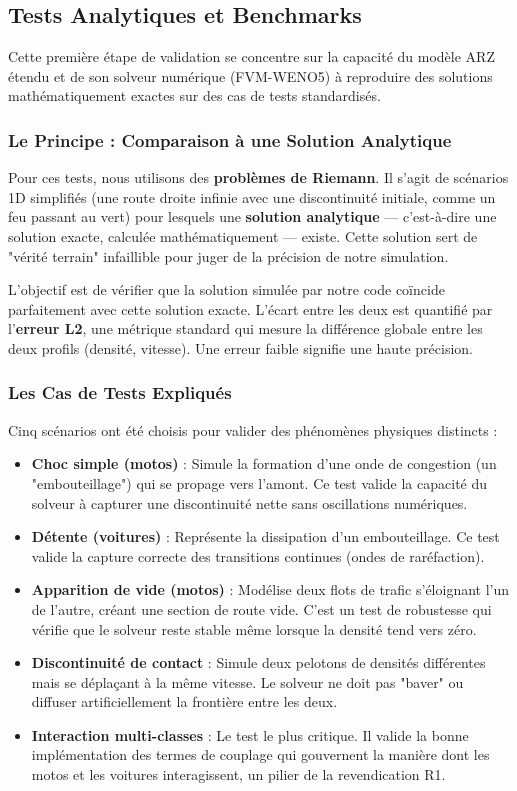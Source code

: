 \subsection{Tests Analytiques et Benchmarks}
\label{subsec:tests_analytiques}

Cette première étape de validation se concentre sur la capacité du modèle ARZ étendu et de son solveur numérique (FVM-WENO5) à reproduire des solutions mathématiquement exactes sur des cas de tests standardisés.

\subsubsection{Le Principe : Comparaison à une Solution Analytique}

Pour ces tests, nous utilisons des \textbf{problèmes de Riemann}. Il s'agit de scénarios 1D simplifiés (une route droite infinie avec une discontinuité initiale, comme un feu passant au vert) pour lesquels une \textbf{solution analytique} — c'est-à-dire une solution exacte, calculée mathématiquement — existe. Cette solution sert de "vérité terrain" infaillible pour juger de la précision de notre simulation.

L'objectif est de vérifier que la solution simulée par notre code coïncide parfaitement avec cette solution exacte. L'écart entre les deux est quantifié par l'\textbf{erreur L2}, une métrique standard qui mesure la différence globale entre les deux profils (densité, vitesse). Une erreur faible signifie une haute précision.

\subsubsection{Les Cas de Tests Expliqués}

Cinq scénarios ont été choisis pour valider des phénomènes physiques distincts :
\begin{itemize}
  \item \textbf{Choc simple (motos)} : Simule la formation d'une onde de congestion (un "embouteillage") qui se propage vers l'amont. Ce test valide la capacité du solveur à capturer une discontinuité nette sans oscillations numériques.
  \item \textbf{Détente (voitures)} : Représente la dissipation d'un embouteillage. Ce test valide la capture correcte des transitions continues (ondes de raréfaction).
  \item \textbf{Apparition de vide (motos)} : Modélise deux flots de trafic s'éloignant l'un de l'autre, créant une section de route vide. C'est un test de robustesse qui vérifie que le solveur reste stable même lorsque la densité tend vers zéro.
  \item \textbf{Discontinuité de contact} : Simule deux pelotons de densités différentes mais se déplaçant à la même vitesse. Le solveur ne doit pas "baver" ou diffuser artificiellement la frontière entre les deux.
  \item \textbf{Interaction multi-classes} : Le test le plus critique. Il valide la bonne implémentation des termes de couplage qui gouvernent la manière dont les motos et les voitures interagissent, un pilier de la revendication R1.
\end{itemize}

